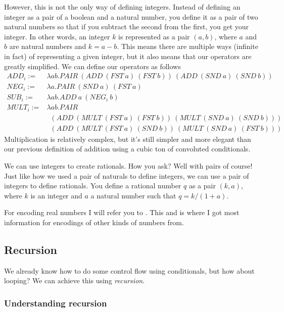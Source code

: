 \documentclass[11pt]{article}
\begin{document}
However, this is not the only way of defining integers. Instead of defining an
integer as a pair of a boolean and a natural number, you define it as a pair of
two natural numbers so that if you subtract the second from the first, you get
your integer. In other words, an integer \(k\) is represented as a pair
\((a,b)\), where \(a\) and \(b\) are natural numbers and \(k=a-b\). This means
there are multiple ways (infinite in fact) of representing a given integer, but
it also means that our operators are greatly simplified. We can define our
operators as follows
\begin{align*}
	ADD_i:=&\lambda ab.PAIR\ (ADD\ (FST\ a)\ (FST\ b))\ (ADD\ (SND\ a)\ (SND\ b))\\
	NEG_i:=&\lambda a.PAIR\ (SND\ a)\ (FST\ a)\\
	SUB_i:=&\lambda ab.ADD\ a\ (NEG_i\ b)\\
	MULT_i:=&\lambda ab.PAIR\\
		&\enspace(ADD\ (MULT\ (FST\ a)\ (FST\ b))\ (MULT\ (SND\ a)\ (SND\ b)))\\
		&\enspace(ADD\ (MULT\ (FST\ a)\ (SND\ b))\ (MULT\ (SND\ a)\ (FST\ b)))
\end{align*}
Multiplication is relatively complex, but it's still simpler and more elegant
than our previous definition of addition using a cubic ton of convoluted
conditionals.

We can use integers to create rationals. How you ask? Well with pairs of
course! Just like how we used a pair of naturals to define integers, we can use
a pair of integers to define rationals. You define a rational number \(q\) as a
pair \((k,a)\), where \(k\) is an integer and \(a\) a natural number such that
\(q=k/(1+a)\).

For encoding real numbers I will refer you to \parencite{stack1}. This and
\parencite{stack2} is where I got most information for encodings of other kinds
of numbers from.


\subsection{Recursion}\label{recursion}


We already know how to do some control flow using conditionals, but how about
looping? We can achieve this using \emph{recursion}.

\subsubsection{Understanding recursion}
\end{document}
